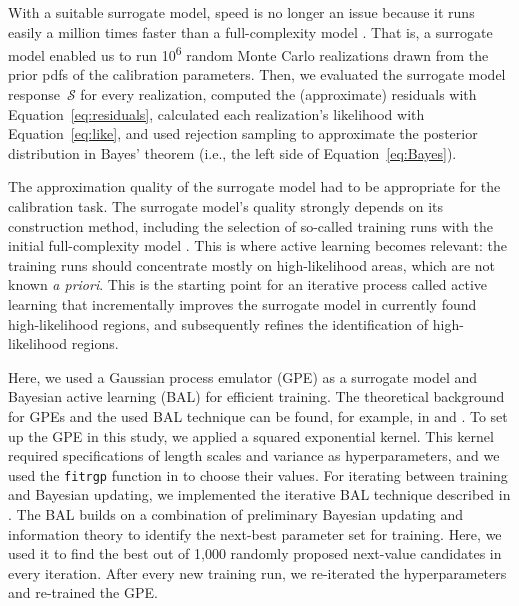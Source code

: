\documentclass[draft,linenumbers,onecolumn]{agujournal2019} %
\begin{document}
With a suitable surrogate model, speed is no longer an issue because it runs easily a million times faster than a full-complexity model \cite{beckers_bayesian_2020}. That is, a surrogate model enabled us to run 10\textsuperscript{6} random Monte Carlo realizations drawn from the prior pdfs of the calibration parameters. Then, we evaluated the surrogate model response~$\mathcal{S}$ for every realization, computed the (approximate) residuals with Equation~\ref{eq:residuals}, calculated each realization's likelihood with Equation~\ref{eq:like}, and used rejection sampling \cite{smith_bayesian_1992} to approximate the posterior distribution in Bayes' theorem (i.e., the left side of Equation~\ref{eq:Bayes}).

The approximation quality of the surrogate model had to be appropriate for the calibration task. The surrogate model's quality strongly depends on its construction method, including the selection of so-called training runs with the initial full-complexity model \cite{busby_hierarchical_2009}. This is where active learning becomes relevant: the training runs should concentrate mostly on high-likelihood areas, which are not known \textit{a priori}. This is the starting point for an iterative process called active learning that incrementally improves the surrogate model in currently found high-likelihood regions, and subsequently refines the identification of high-likelihood regions.

Here, we used a Gaussian process emulator (GPE) as a surrogate model and Bayesian active learning (BAL) for efficient training. The theoretical background for GPEs and the used BAL technique can be found, for example, in  and . To set up the GPE in this study, we applied a squared exponential kernel. This kernel required specifications of length scales and variance as hyperparameters, and we used the \texttt{fitrgp} function in  to choose their values. For iterating between training and Bayesian updating, we implemented the iterative BAL technique described in . The BAL builds on a combination of preliminary Bayesian updating and information theory \cite{oladyshkin_connection_2019} to identify the next-best parameter set for training. Here, we used it to find the best out of 1,000 randomly proposed next-value candidates in every iteration. After every new training run, we re-iterated the hyperparameters and re-trained the GPE.
\end{document}
